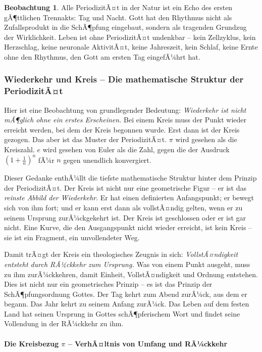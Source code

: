 ﻿\documentclass[a4paper,12pt]{article}
\theoremstyle{definition}
\newtheorem{observation}{Beobachtung}[section]
\begin{document}
\begin{observation}
	Alle PeriodizitÃ¤t in der Natur ist ein Echo des ersten gÃ¶ttlichen Trennakts:
	Tag und Nacht. Gott hat den Rhythmus nicht als Zufallsprodukt in die SchÃ¶pfung
	eingebaut, sondern als tragenden Grundzug der Wirklichkeit. Leben ist ohne
	PeriodizitÃ¤t undenkbar -- kein Zellzyklus, kein Herzschlag, keine neuronale
	AktivitÃ¤t, keine Jahreszeit, kein Schlaf, keine Ernte ohne den Rhythmus, den
	Gott am ersten Tag eingefÃ¼hrt hat.
\end{observation}

\subsubsection{Wiederkehr und Kreis -- Die mathematische Struktur der PeriodizitÃ¤t}

Hier ist eine Beobachtung von grundlegender Bedeutung: \textit{Wiederkehr ist
	nicht mÃ¶glich ohne ein erstes Erscheinen.} Bei einem Kreis muss der Punkt wieder
erreicht werden, bei dem der Kreis begonnen wurde. Erst dann ist der Kreis gezogen.
Das aber ist das Muster der PeriodizitÃ¤t. $\pi$ wird gesehen als die Kreiszahl. $e$ wird gesehen von Euler als die Zahl, gegen die der Ausdruck $\left(1 + \frac{1}{n}\right)^n$ fÃ¼r $n $ gegen unendlich konvergiert.

Dieser Gedanke enthÃ¼llt die tiefste mathematische Struktur hinter dem Prinzip der
PeriodizitÃ¤t. Der Kreis ist nicht nur eine geometrische Figur -- er ist das
\textit{reinste Abbild der Wiederkehr}. Er hat einen definierten Anfangspunkt;
er bewegt sich von ihm fort; und er kann erst dann als vollstÃ¤ndig gelten, wenn
er zu seinem Ursprung zurÃ¼ckgekehrt ist. Der Kreis ist geschlossen oder er ist
gar nicht. Eine Kurve, die den Ausgangspunkt nicht wieder erreicht, ist kein
Kreis -- sie ist ein Fragment, ein unvollendeter Weg.

Damit trÃ¤gt der Kreis ein theologisches Zeugnis in sich: \textit{VollstÃ¤ndigkeit
	entsteht durch RÃ¼ckkehr zum Ursprung.} Was von einem Punkt ausgeht, muss zu ihm
zurÃ¼ckkehren, damit Einheit, VollstÃ¤ndigkeit und Ordnung entstehen. Dies ist nicht
nur ein geometrisches Prinzip -- es ist das Prinzip der SchÃ¶pfungsordnung Gottes.
Der Tag kehrt zum Abend zurÃ¼ck, aus dem er begann. Das Jahr kehrt zu seinem Anfang
zurÃ¼ck. Das Leben auf dem festen Land hat seinen Ursprung in Gottes schÃ¶pferischem
Wort und findet seine Vollendung in der RÃ¼ckkehr zu ihm.

\paragraph{Die Kreisbezug $\pi$ -- VerhÃ¤ltnis von Umfang und RÃ¼ckkehr}
\end{document}
